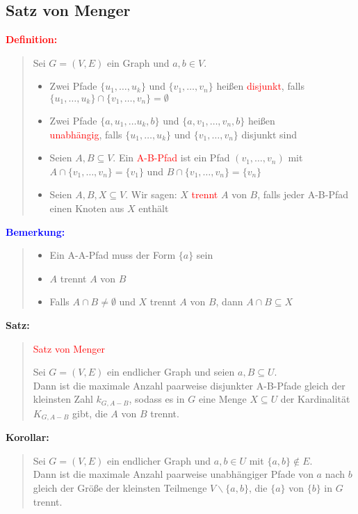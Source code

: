 \documentclass{article}
\newcommand{\red}[1]{\textcolor{red}{#1}}
\newcommand{\blue}[1]{\textcolor{blue}{#1}}
\newcommand{\dgr}[1]{\textcolor{dgr}{#1}}
\newcommand{\de}[1]{\red{\textbf{Definition: }}\begin{quote}#1\end{quote}}
\newcommand{\an}[1]{\blue{\textbf{Bemerkung: }}\begin{quote}#1\end{quote}}
\newcommand{\se}[1]{\dgr{\textbf{Satz: }}\begin{quote}#1\end{quote}}
\newcommand{\co}[1]{\dgr{\textbf{Korollar: }}\begin{quote}#1\end{quote}}
\begin{document}
\newpage
\subsection{Satz von Menger}

\de{
    Sei $G=(V,E)$ ein Graph und $a,b \in V$.
    \begin{itemize}
        \item Zwei Pfade $\{u_1, \dots, u_k\}$ und $\{v_1, \dots, v_n\}$ heißen \red{disjunkt}, falls $\{u_1, \dots, u_k\} \cap \{v_1, \dots, v_n\} = \emptyset$
        \item Zwei Pfade $\{a, u_1, \dots u_k, b\}$ und $\{a, v_1, \dots, v_n, b\}$ heißen\\
        \red{unabhängig}, falls $\{u_1, \dots, u_k\}$ und $\{v_1, \dots, v_n\}$ disjunkt sind
        \item Seien $A, B \subseteq V$. Ein \red{A-B-Pfad} ist ein Pfad $(v_1, \dots, v_n)$ mit $A \cap \{v_1, \dots, v_n\} = \{v_1\}$ und $B \cap \{v_1, \dots, v_n\} = \{v_n\}$
        \item Seien $A,B,X \subseteq V$. Wir sagen: $X$ \red{trennt} $A$ von $B$, falls jeder A-B-Pfad einen Knoten aus $X$ enthält
    \end{itemize}
}

\an{
    \begin{itemize}
        \item Ein A-A-Pfad muss der Form $\{a\}$ sein
        \item $A$ trennt $A$ von $B$
        \item Falls $A \cap B \ne \emptyset$ und $X$ trennt $A$ von $B$, dann $A \cap B \subseteq X$
    \end{itemize}
}

\se{\red{Satz von Menger}

    Sei $G=(V,E)$ ein endlicher Graph und seien $a, B \subseteq U$.\\
    Dann ist die maximale Anzahl paarweise disjunkter A-B-Pfade gleich der kleinsten Zahl $k_{G,A-B}$, sodass es in $G$ eine Menge $X \subseteq U$ der Kardinalität $K_{G,A-B}$ gibt, die $A$ von $B$ trennt.
}


\co{
    Sei $G=(V,E)$ ein endlicher Graph und $a,b \in U$ mit $\{a,b\} \notin E$.\\
    Dann ist die maximale Anzahl paarweise unabhängiger Pfade von $a$ nach $b$ gleich der Größe der kleinsten Teilmenge $V \backslash \{a,b\}$, die $\{a\}$ von $\{b\}$ in $G$ trennt.
}
\end{document}
